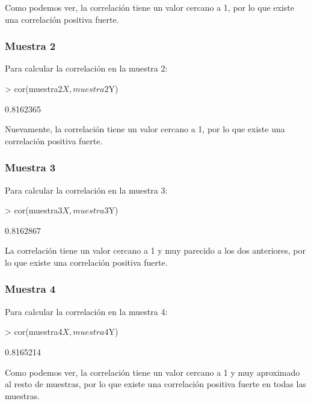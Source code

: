 \documentclass[a4paper]{article}
\begin{document}
Como podemos ver, la correlación tiene un valor cercano a 1, por lo que existe una correlación positiva fuerte.

\subsubsection{Muestra 2} Para calcular la correlación en la muestra 2:
\begin{Schunk}
\begin{Sinput}
> cor(muestra2$X,muestra2$Y)
\end{Sinput}
\begin{Soutput}
[1] 0.8162365
\end{Soutput}
\end{Schunk}

Nuevamente, la correlación tiene un valor cercano a 1, por lo que existe una correlación positiva fuerte.

\subsubsection{Muestra 3} Para calcular la correlación en la muestra 3:
\begin{Schunk}
\begin{Sinput}
> cor(muestra3$X,muestra3$Y)
\end{Sinput}
\begin{Soutput}
[1] 0.8162867
\end{Soutput}
\end{Schunk}

La correlación tiene un valor cercano a 1 y muy parecido a los dos anteriores, por lo que existe una correlación positiva fuerte.

\subsubsection{Muestra 4} Para calcular la correlación en la muestra 4:
\begin{Schunk}
\begin{Sinput}
> cor(muestra4$X,muestra4$Y)
\end{Sinput}
\begin{Soutput}
[1] 0.8165214
\end{Soutput}
\end{Schunk}

Como podemos ver, la correlación tiene un valor cercano a 1 y muy aproximado al resto de muestras, por lo que existe una correlación positiva fuerte en todas las muestras.
\end{document}
